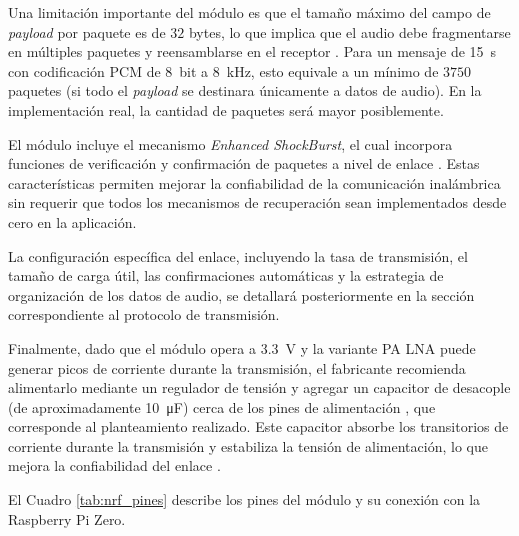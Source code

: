 Una limitación importante del módulo es que el tamaño máximo del campo de \textit{payload} por paquete es de $32$ bytes, lo que implica que el audio debe fragmentarse en múltiples paquetes y reensamblarse en el receptor \cite{nordic}.
Para un mensaje de \SI{15}{\second} con codificación PCM de \SI{8}{bit} a \SI{8}{\kilo\hertz}, esto equivale a un mínimo de $3750$ paquetes (si todo el \textit{payload} se destinara únicamente a datos de audio).
En la implementación real, la cantidad de paquetes será mayor posiblemente.

El módulo incluye el mecanismo \textit{Enhanced ShockBurst}, el cual incorpora funciones de verificación y confirmación de paquetes a nivel de enlace \cite{nordic}.
Estas características permiten mejorar la confiabilidad de la comunicación inalámbrica sin requerir que todos los mecanismos de recuperación sean implementados desde cero en la aplicación.

La configuración específica del enlace, incluyendo la tasa de transmisión, el tamaño de carga útil, las confirmaciones automáticas y la estrategia de organización de los datos de audio, se detallará posteriormente en la sección correspondiente al protocolo de transmisión.

Finalmente, dado que el módulo opera a \SI{3.3}{\volt} y la variante PA LNA puede generar picos de corriente durante la transmisión, el fabricante recomienda alimentarlo mediante un regulador de tensión y agregar un capacitor de desacople (de aproximadamente \SI{10}{\micro\farad}) cerca de los pines de alimentación \cite{nordic}, que corresponde al planteamiento realizado.
Este capacitor absorbe los transitorios de corriente durante la transmisión y estabiliza la tensión de alimentación, lo que mejora la confiabilidad del enlace \cite{nordic}.

El Cuadro \ref{tab:nrf_pines} describe los pines del módulo y su conexión con la Raspberry Pi Zero.

